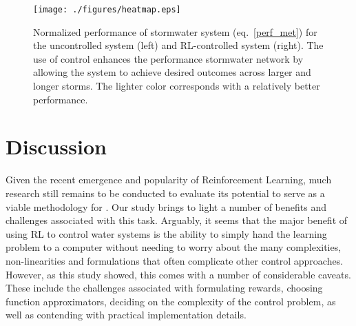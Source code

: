 \begin{figure}[H]
    \centering
    \texttt{[image: ./figures/heatmap.eps]}
    \caption{Normalized performance of stormwater system (eq.~\ref{perf_met}) for the uncontrolled system (left) and RL-controlled system (right). The use of control enhances the performance stormwater network by allowing the system to achieve desired outcomes across larger and longer storms. The lighter color  corresponds with a relatively better performance.}\label{fig:7}
\end{figure}


\section{Discussion}

Given the recent emergence and popularity of Reinforcement Learning, much research still remains to be conducted to evaluate its potential to serve as a viable methodology for  .
Our study brings to light a number of benefits and challenges associated with this task.
Arguably, it seems that the major benefit of using RL to control water systems is the ability to simply hand the learning problem to a computer without needing to worry about the many complexities, non-linearities and formulations that often complicate other control approaches.
However, as this study showed, this comes with a number of considerable caveats.
These include the challenges associated with formulating rewards, choosing function approximators, deciding on the complexity of the control problem, as well as contending with practical implementation details.

